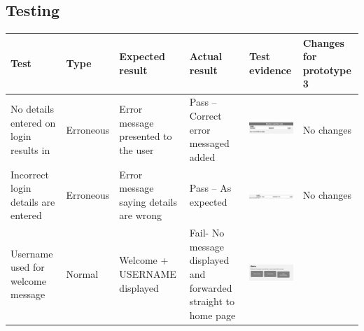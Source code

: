 \subsection{Testing}
\begin{center}
\begin{longtable}{|P{17mm}|P{17mm}|P{16mm}|P{17mm}|P{40mm}|P{21.5mm}|}
  \hline
  \textbf{Test} & \textbf{Type} & \textbf{Expected result} & \textbf{Actual result} & \textbf{Test evidence} & \textbf{Changes for prototype 3}\\
  \hline
  \endfirsthead
  \hline
  \endhead
  \hline 

  \endfoot
  \endlastfoot
No details entered on login results in & Erroneous & Error message
presented to the user & Pass -- Correct error messaged added &
\includegraphics[width=38mm]{ch3_developing/proto2/media/image2.png} &
No changes \\ \hline
Incorrect login details are entered & Erroneous & Error message saying
details are wrong & Pass -- As expected &
\includegraphics[width=38mm]{ch3_developing/proto2/media/image3.png} &
No changes \\ \hline
Username used for welcome message & Normal & Welcome + USERNAME
displayed & Fail- No message displayed and forwarded straight to home
page &
\includegraphics[width=38mm]{ch3_developing/proto2/media/image4.png}


\end{longtable}
\end{center}
